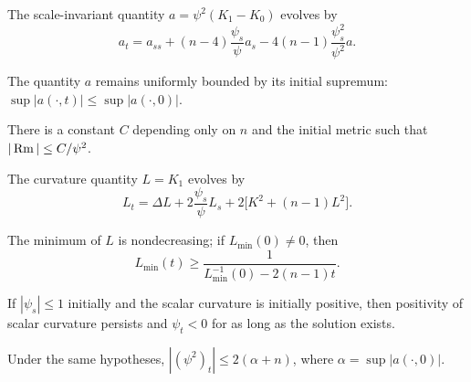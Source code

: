\begin{lemma}
\label{ch02-lem-neckpinch-a-evolution}
The scale-invariant quantity \(a=\psi^2(K_1-K_0)\) evolves by
\[
a_t=a_{ss}+(n-4)\frac{\psi_s}{\psi}a_s-4(n-1)\frac{\psi_s^2}{\psi^2}a.
\]
\end{lemma}

\begin{corollary}
\label{ch02-cor-neckpinch-a-bound}
The quantity \(a\) remains uniformly bounded by its initial supremum:
\(\sup|a(\cdot,t)|\le \sup|a(\cdot,0)|\).
\end{corollary}

\begin{corollary}
\label{ch02-cor-neckpinch-curvature-radius}
There is a constant \(C\) depending only on \(n\) and the initial metric such
that \(|\operatorname{Rm}|\le C/\psi^2\).
\end{corollary}

\begin{lemma}
\label{ch02-lem-neckpinch-L-evolution}
The curvature quantity \(L=K_1\) evolves by
\[
L_t=\Delta L+2\frac{\psi_s}{\psi}L_s+2\bigl[K^2+(n-1)L^2\bigr].
\]
\end{lemma}

\begin{corollary}
\label{ch02-cor-neckpinch-Lmin}
The minimum of \(L\) is nondecreasing; if \(L_{\min}(0)\neq 0\), then
\[
L_{\min}(t)\ge \frac{1}{L_{\min}^{-1}(0)-2(n-1)t}.
\]
\end{corollary}

\begin{lemma}
\label{ch02-lem-neckpinch-shrinking-radius}
If \(|\psi_s|\le 1\) initially and the scalar curvature is initially positive,
then positivity of scalar curvature persists and \(\psi_t<0\) for as long as
the solution exists.
\end{lemma}

\begin{lemma}
\label{ch02-lem-neckpinch-lipschitz}
Under the same hypotheses, \(|(\psi^2)_t|\le 2(\alpha+n)\), where
\(\alpha=\sup|a(\cdot,0)|\).
\end{lemma}

